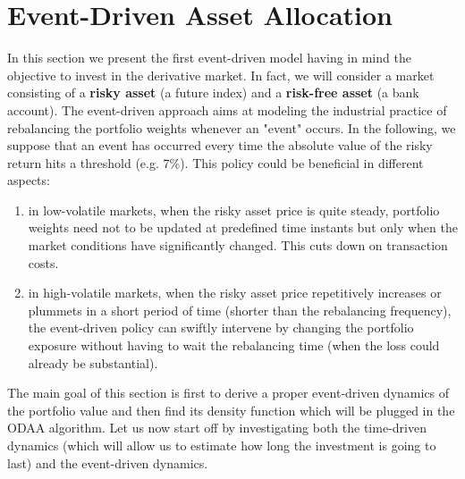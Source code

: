 \section{Event-Driven Asset Allocation}\label{sec:EventDrivenAA}
In this section we present the first event-driven model having in mind the objective to invest in the derivative market. In fact, we will consider a market consisting of a \textbf{risky asset} (a future index) and a \textbf{risk-free asset} (a bank account). The event-driven approach aims at modeling the industrial practice of rebalancing the portfolio weights whenever an "event" occurs. In the following, we suppose that an event has occurred every time the absolute value of the risky return hits a threshold (e.g. 7\%). This policy could be beneficial in different aspects:
\begin{enumerate}
	\item in low-volatile markets, when the risky asset price is quite steady, portfolio weights need not to be updated at predefined time instants but only when the market conditions have significantly changed. This cuts down on transaction costs.
	\item in high-volatile markets, when the risky asset price repetitively increases or plummets in a short period of time (shorter than the rebalancing frequency), the event-driven policy can swiftly intervene by changing the portfolio exposure without having to wait the rebalancing time (when the loss could already be substantial).
\end{enumerate}
The main goal of this section is first to derive a proper event-driven dynamics of the portfolio value and then find its density function which will be plugged in the ODAA algorithm.
Let us now start off by investigating both the time-driven dynamics (which will allow us to estimate how long the investment is going to last) and the event-driven dynamics.
